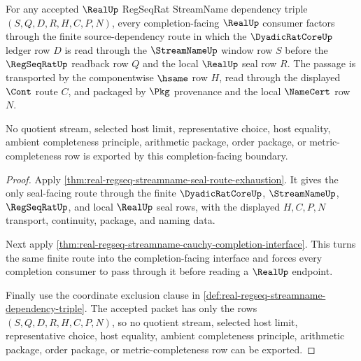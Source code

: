 \begin{theorem}
\label{thm:real-finite-window-completion-boundary}
For any accepted $\RealUp$ RegSeqRat StreamName dependency triple
$(S,Q,D,R,H,C,P,N)$, every completion-facing $\RealUp$ consumer factors through
the finite source-dependency route in which the $\DyadicRatCoreUp$ ledger row
$D$ is read through the $\StreamNameUp$ window row $S$ before the
$\RegSeqRatUp$ readback row $Q$ and the local $\RealUp$ seal row $R$. The
passage is transported by the componentwise $\hsame$ row $H$, read through the
displayed $\Cont$ route $C$, and packaged by $\Pkg$ provenance and the local
$\NameCert$ row $N$.

No quotient stream, selected host limit, representative choice, host equality,
ambient completeness principle, arithmetic package, order package, or
metric-completeness row is exported by this completion-facing boundary.
\end{theorem}
\begin{proof}
Apply \autoref{thm:real-regseq-streamname-seal-route-exhaustion}. It gives the
only seal-facing route through the finite $\DyadicRatCoreUp$, $\StreamNameUp$,
$\RegSeqRatUp$, and local $\RealUp$ seal rows, with the displayed $H,C,P,N$
transport, continuity, package, and naming data.

Next apply
\autoref{thm:real-regseq-streamname-cauchy-completion-interface}. This turns
the same finite route into the completion-facing interface and forces every
completion consumer to pass through it before reading a $\RealUp$ endpoint.

Finally use the coordinate exclusion clause in
\autoref{def:real-regseq-streamname-dependency-triple}. The accepted packet
has only the rows $(S,Q,D,R,H,C,P,N)$, so no quotient stream, selected host
limit, representative choice, host equality, ambient completeness principle,
arithmetic package, order package, or metric-completeness row can be exported.
\end{proof}

